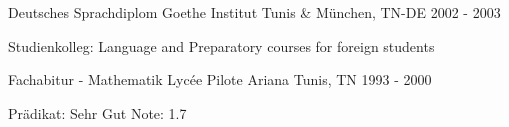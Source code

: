 \begin{cventries}
\cventry
{Deutsches Sprachdiplom} %
{Goethe Institut} %
{Tunis \& M\"unchen, TN-DE} %
{2002 - 2003} %
{ %
\begin{cvitems}
\item {Studienkolleg: Language and Preparatory courses for foreign students}
\end{cvitems}
}

\cventry
{Fachabitur - Mathematik} %
{Lycée Pilote Ariana} %
{Tunis, TN} %
{1993 - 2000} %
{ %
\begin{cvitems}
\item {Pr\"adikat: Sehr Gut {\cdotp} Note: 1.7}
\end{cvitems}
}



\end{cventries}
